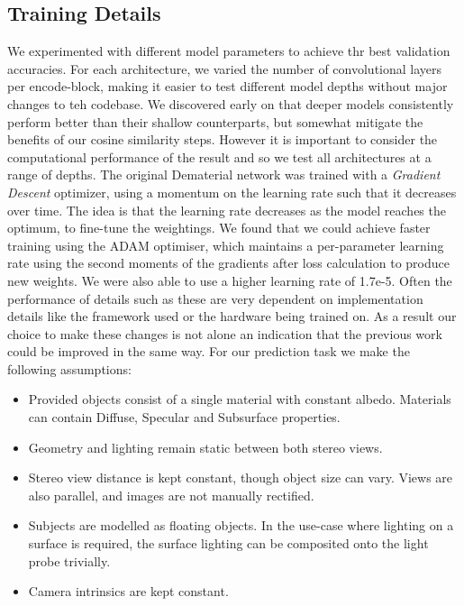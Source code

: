 \documentclass[ %
                    author={Gavin Parker},
                supervisor={Dr. Neill Campbell},
                    degree={MEng},
                     title={Deep Siamese Networks for Illumination Estimation from Stereo Images},
                  subtitle={},
                      type={research},
                      year={2018} ]{dissertation}
\begin{document}
\subsection{Training Details}
 We experimented with different model parameters to achieve thr best validation accuracies. For each architecture, we varied the number of convolutional layers per encode-block, making it easier to test different model depths without major changes to teh codebase. We discovered early on that deeper models consistently perform better than their shallow counterparts, but somewhat mitigate the benefits of our cosine similarity steps. However it is important to consider the computational performance of the result and so we test all architectures at a range of depths.
\newline
The original Dematerial network was trained with a \textit{Gradient Descent} optimizer, using a momentum on the learning rate such that it decreases over time. The idea is that the learning rate decreases as the model reaches the optimum, to fine-tune the weightings. We found that we could achieve faster training using the ADAM optimiser, which maintains a per-parameter learning rate using the second moments of the gradients after loss calculation to produce new weights. We were also able to use a higher learning rate of 1.7e-5. Often the performance of details such as these are very dependent on implementation details like the framework used or the hardware being trained on. As a result our choice to make these changes is not alone an indication that the previous work could be improved in the same way.
\newline
For our prediction task we make the following assumptions:
\begin{itemize}
\item Provided objects consist of a single material with constant albedo. Materials can contain Diffuse, Specular and Subsurface properties.
\item Geometry and lighting remain static between both stereo views.
\item Stereo view distance is kept constant, though object size can vary. Views are also parallel, and images are not manually rectified.
\item Subjects are modelled as floating objects. In the use-case where lighting on a surface is required, the surface lighting can be composited onto the light probe trivially.
\item Camera intrinsics are kept constant.
\end{itemize}
\end{document}
